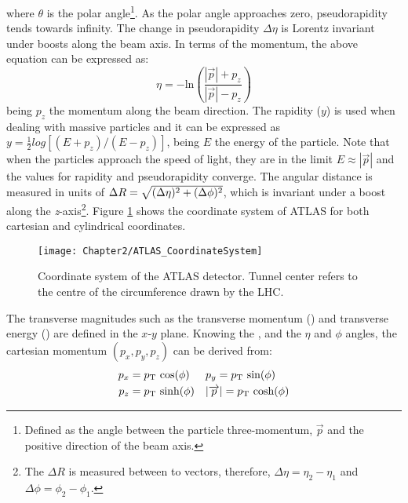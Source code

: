 where $\theta$ is the polar angle\footnote{Defined as the angle between the particle three-momentum, $\overrightarrow{p}$ and the positive direction of the beam axis.}.  
As the polar angle approaches zero, pseudorapidity tends towards infinity.
The change in pseudorapidity $\Delta \eta$ is Lorentz invariant under boosts along the beam axis.
In terms of the momentum, the above equation can be expressed as:
\begin{equation*}
	\eta = -\textrm{ln} \left( \frac{|\overrightarrow{p}| + p_z}{|\overrightarrow{p}| - p_z}\right) 
\end{equation*}
being $p_z$ the momentum along the beam direction.
The rapidity ($y$) is used when dealing with massive particles and it can be expressed 
as $y = \frac{1}{2}log[(E+p_{z})/(E-p_{z})]$, being $E$ the energy of the particle.
Note that when the particles approach the speed of light, 
they are in the limit $E \approx |\overrightarrow{p}|$ and the values for rapidity and 
pseudorapidity converge.
The angular distance is measured in units of $\Delta R = \sqrt{(\Delta \eta)^{2}+(\Delta \phi)^{2}}$, which is invariant under a boost along the 
\textit{z}-axis\footnote{The $\Delta R$ is measured between to vectors, therefore, $\Delta \eta = \eta_2 - \eta_1$ and $\Delta \phi = \phi_2 - \phi_1$.}.
Figure \ref{fig:Chap2:ATLAS:CoordinateSystem} shows the coordinate system of ATLAS for both cartesian and cylindrical coordinates. 

\begin{figure}
	\centering
 	 \texttt{[image: Chapter2/ATLAS\_CoordinateSystem]}
	 \caption{Coordinate system of the ATLAS detector. Tunnel center refers to the centre of the
	 circumference  drawn by the LHC.}
	\label{fig:Chap2:ATLAS:CoordinateSystem}
\end{figure}

The transverse magnitudes such as the transverse momentum (\pT) and transverse energy (\ET) are defined in the $x$-$y$ plane. 
Knowing the \pT, and the $\eta$ and $\phi$ angles, the cartesian momentum $(p_{x} , p_{y} , p_{z})$ can be derived from:
\begin{align*}
	p_x &= p_{\text{T}} \textrm{ cos}(\phi) 	&&  	p_y= p_{\text{T}} \textrm{ sin}(\phi) \\
	p_z &= p_{\text{T}} \textrm{ sinh}(\phi) 	&& 	|\overrightarrow{p}|= p_{\text{T}} \textrm{ cosh}(\phi)
\end{align*}

